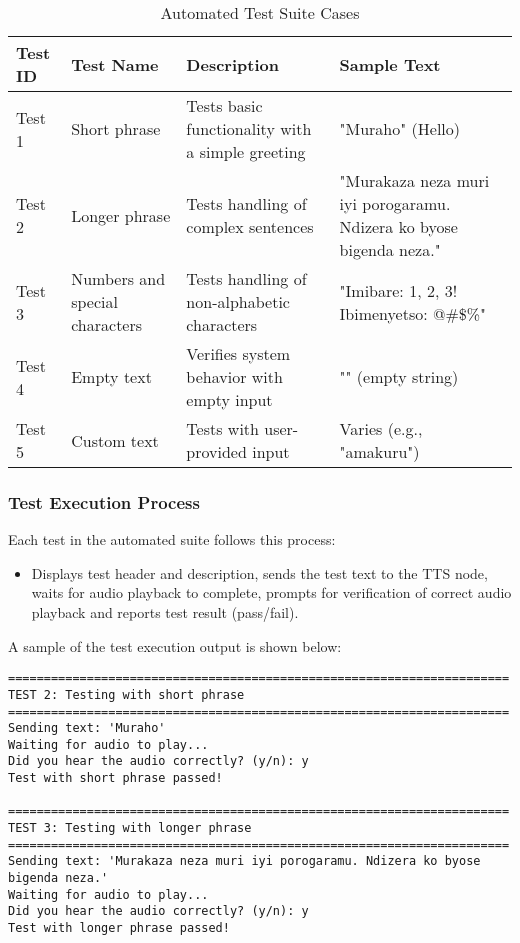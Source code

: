 \documentclass{CSSRforAfrica}
\begin{document}
\begin{table}[h]
\centering
\begin{tabular}{|p{1.5cm}|p{3cm}|p{4cm}|p{4cm}|}
\hline
\textbf{Test ID} & \textbf{Test Name} & \textbf{Description} & \textbf{Sample Text} \\
\hline
Test 1 & Short phrase & Tests basic functionality with a simple greeting & "Muraho" (Hello) \\
\hline
Test 2 & Longer phrase & Tests handling of complex sentences & "Murakaza neza muri iyi porogaramu. Ndizera ko byose bigenda neza." \\
\hline
Test 3 & Numbers and special characters & Tests handling of non-alphabetic characters & "Imibare: 1, 2, 3! Ibimenyetso: @\#\$\%" \\
\hline
Test 4 & Empty text & Verifies system behavior with empty input & "" (empty string) \\
\hline
Test 5 & Custom text & Tests with user-provided input & Varies (e.g., "amakuru") \\
\hline
\end{tabular}
\caption{Automated Test Suite Cases}
\label{table:test-cases}
\end{table}

\subsubsection{Test Execution Process}
Each test in the automated suite follows this process:
\begin{itemize}
    \item Displays test header and description, sends the test text to the TTS node, waits for audio playback to complete, prompts for verification of correct audio playback and reports test result (pass/fail).
\end{itemize}

A sample of the test execution output is shown below:

\begin{lstlisting}[style=commandstyle]
======================================================================
TEST 2: Testing with short phrase
======================================================================
Sending text: 'Muraho'
Waiting for audio to play...
Did you hear the audio correctly? (y/n): y
Test with short phrase passed!

======================================================================
TEST 3: Testing with longer phrase
======================================================================
Sending text: 'Murakaza neza muri iyi porogaramu. Ndizera ko byose bigenda neza.'
Waiting for audio to play...
Did you hear the audio correctly? (y/n): y
Test with longer phrase passed!
\end{lstlisting}
\end{document}
